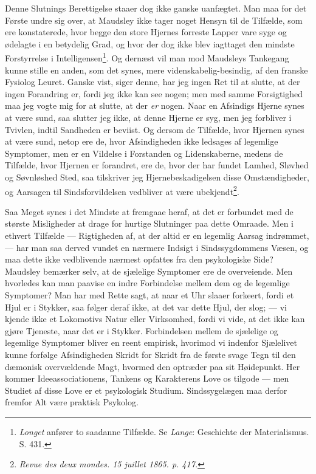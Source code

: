 \documentclass[12pt,a4paper,openany]{book}
\newcommand{\opage}[1]{\marginnote{\footnotesize\textit{[#1]}}}
\begin{document}
Denne Slutnings Berettigelse staaer dog ikke ganske
uanfægtet. Man maa for det Første undre sig over, at
Maudsley ikke tager noget Hensyn til de Tilfælde, som ere
konstaterede, hvor begge den store Hjernes forreste Lapper
vare syge og ødelagte i en betydelig Grad, og hvor der dog
ikke blev iagttaget den mindste Forstyrrelse i Intelligensen\footnote{\emph{Longet} anfører to saadanne Tilfælde. Se \emph{Lange}: Geschichte der Materialismus. S. 431.}.
Og dernæst vil man mod Maudsleys Tankegang kunne
stille en anden, som det synes, mere videnskabelig-besindig, af
\opage{324}den franske Fysiolog Leuret. Ganske vist, siger denne, har
jeg ingen Ret til at slutte, at der ingen Forandring er,
fordi jeg ikke kan see nogen; men med samme Forsigtighed
maa jeg vogte mig for at slutte, at der \emph{er} nogen. Naar
en Afsindigs Hjerne synes at være sund, saa slutter jeg ikke,
at denne Hjerne er syg, men jeg forbliver i Tvivlen, indtil
Sandheden er beviist. Og dersom de Tilfælde, hvor Hjernen
synes at være sund, netop ere de, hvor Afsindigheden ikke
ledsages af legemlige Symptomer, men er en Vildelse i
Forstanden og Lidenskaberne, medens de Tilfælde, hvor
Hjernen er forandret, ere de, hvor der har fundet Lamhed,
Sløvhed og Søvnløshed Sted, saa tilskriver jeg Hjernebeskadigelsen
disse Omstændigheder, og Aarsagen til Sindsforvildelsen
vedbliver at være ubekjendt\footnote{\textit{Revue des deux mondes. 15 juillet 1865. p. 417.}}.

Saa Meget synes i det Mindste at fremgaae heraf, at det
er forbundet med de største Misligheder at drage for hurtige
Slutninger paa dette Omraade. Men i ethvert Tilfælde
--- Rigtigheden af, at der altid er en legemlig Aarsag indrømmet,
--- har man saa derved vundet en nærmere Indsigt i
Sindssygdommens Væsen, og maa dette ikke vedblivende
nærmest opfattes fra den psykologiske Side? Maudsley bemærker
selv, at de sjælelige Symptomer ere de overveiende.
Men hvorledes kan man paavise en indre Forbindelse mellem
dem og de legemlige Symptomer? Man har med Rette
sagt, at naar et Uhr slaaer forkeert, fordi et Hjul er i
Stykker, saa følger deraf ikke, at det var dette Hjul, der
slog; --- vi kjende ikke et Lokomotivs Natur eller Virksomhed,
fordi vi vide, at det ikke kan gjøre Tjeneste, naar det er i
Stykker. Forbindelsen mellem de sjælelige og legemlige
Symptomer bliver en reent empirisk, hvorimod vi indenfor
Sjælelivet kunne forfølge Afsindigheden Skridt for Skridt
fra de første svage Tegn til den dæmonisk overvældende
Magt, hvormed den optræder paa sit Høidepunkt. Her
\opage{325}kommer Ideeassociationens, Tankens og Karakterens Love os
tilgode --- men Studiet af disse Love er et psykologisk Studium.
Sindssygelægen maa derfor fremfor Alt være praktisk
Psykolog.
\end{document}
